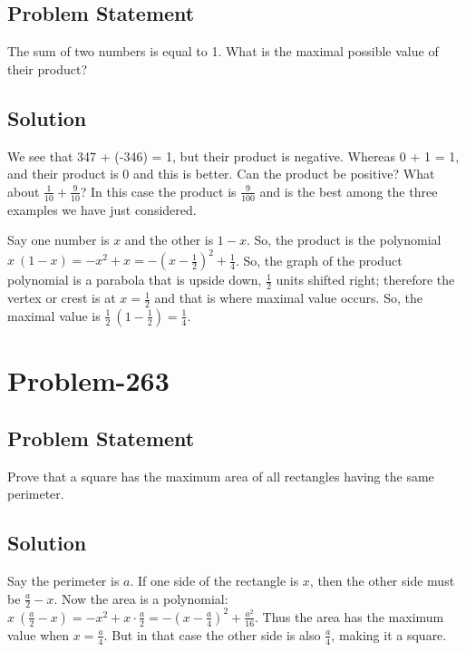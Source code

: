 \documentclass[12pt]{article}
\begin{document}
\subsection*{Problem Statement}
The sum of two numbers is equal to 1. What is the maximal possible value of their product?

\subsection*{Solution}
We see that 347 + (-346) = 1, but their product is negative. Whereas 0 + 1 = 1, and their product is 0 and this is better. Can the product be positive? What about $\frac{1}{10} + \frac{9}{10}$? In this case the product is $\frac{9}{100}$ and is the best among the three examples we have just considered.

Say one number is $x$ and the other is $1-x$. So, the product is the polynomial $x\ (1-x) = -x^2+x = -\left( x - \frac{1}{2} \right)^2 + \frac{1}{4}$. So, the graph of the product polynomial is a parabola that is upside down, $\frac{1}{2}$ units shifted right; therefore the vertex or crest is at $x = \frac{1}{2}$ and that is where maximal value occurs. So, the maximal value is $\frac{1}{2}\ \left( 1 - \frac{1}{2} \right) = \frac{1}{4}$.

\section*{Problem-263}
\subsection*{Problem Statement}
Prove that a square has the maximum area of all rectangles having the same perimeter.

\subsection*{Solution}
Say the perimeter is $a$. If one side of the rectangle is $x$, then the other side must be $\frac{a}{2} - x$. Now the area is a polynomial:  $x\ \left( \frac{a}{2}-x \right) = -x^2 + x\cdot \frac{a}{2} = -\left( x - \frac{a}{4} \right)^2 + \frac{a^2}{16}$. Thus the area has the maximum value when $x = \frac{a}{4}$. But in that case the other side is also $\frac{a}{4}$, making it a square.
\end{document}
